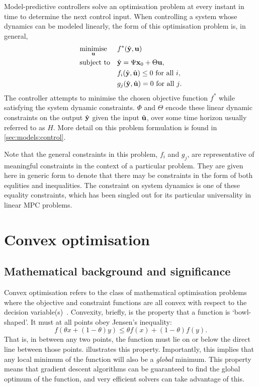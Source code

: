 Model-predictive controllers solve an optimisation problem at every instant in time to determine the next control input.
When controlling a system whose dynamics can be modeled linearly, the form of this optimisation problem is, in general,
\begin{equation}
   \label{eq:mpc-opt}
   \begin{aligned}
      & \underset{\mathbf{u}}{\text{minimise}}
      & & f^*(\hat{\mathbf{y}}, \mathbf{u}) \\
      & \text{subject to}
      & & \hat{\mathbf{y}} = \Psi \mathbf{x}_0 + \Theta \mathbf{u}, \\
      &&& f_i(\hat{\mathbf{y}}, \hat{\mathbf{u}}) \le 0\ \text{for all $i$}, \\
      &&& g_j(\hat{\mathbf{y}}, \hat{\mathbf{u}})   = 0\ \text{for all $j$}. \\
   \end{aligned}
\end{equation}
The controller attempts to minimise the chosen objective function $f^*$ while satisfying the system dynamic constraints.
$\Phi$ and $\Theta$ encode these linear dynamic constraints on the output $\hat{\mathbf{y}}$ given the input $\hat{\mathbf{u}}$, over some time horizon usually referred to as $H$.
More detail on this problem formulation is found in \autoref{sec:models:control}.

Note that the general constraints in this problem, $f_i$ and $g_j$, are representative of meaningful constraints in the context of a particular problem.
They are given here in generic form to denote that there may be constraints in the form of both equlities and inequalities.
The constraint on system dynamics is one of these equality constraints, which has been singled out for its particular universality in linear MPC problems.

\section{Convex optimisation}
\label{sec:background:convex}

\subsection{Mathematical background and significance}

Convex optimisation refers to the class of mathematical optimisation problems where the objective and constraint functions are all convex with respect to the decision variable(s)~\cite{Boyd04}.
Convexity, briefly, is the property that a function is `bowl-shaped'.
It must at all points obey Jensen's inequality:
\begin{equation}
   \label{eq:jensen}
   f(\theta x + (1-\theta)y) \le \theta f(x) + (1-\theta) f(y).
\end{equation}
That is, in between any two points, the function must lie on or below the direct line between those points.
 illustrates this property.
Importantly, this implies that any local minimum of the function will also be a \emph{global} minimum.
This property means that gradient descent algorithms can be guaranteed to find the global optimum of the function, and very efficient solvers can take advantage of this.

